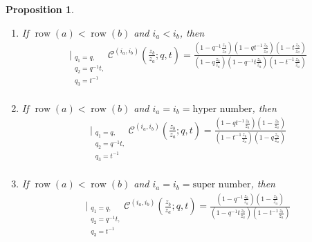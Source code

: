 \documentclass[12pt,reqno,a4paper]{amsart}
\newcommand{\cals}[1]{\mathcal{#1}}
\numberwithin{equation}{section}
\newtheorem{prop}[thm]{Proposition}
\theoremstyle{definition}
\begin{document}
\begin{prop}
\begin{enumerate}[(1)]
\begin{align}
{			\substack{
				q_1 = q, \\
				q_2 = q^{-1}t,\\
				q_3 = t^{-1} \\
			}
		}
		\cals{C}^{(i_a,i_b)}\left(
		\frac{z_b}{z_a}
		; q, t
		\right)
		= 1
	\end{align}
	\normalsize
	\item If $\operatorname{row}(a) < \operatorname{row}(b)$ and $i_a < i_b$, then 
	\footnotesize
	\begin{align}
		\bigg|_{
			\substack{
				q_1 = q, \\
				q_2 = q^{-1}t,\\
				q_3 = t^{-1} \\
			}
		}
		\cals{C}^{(i_a,i_b)}\left(
		\frac{z_b}{z_a}
		; q, t
		\right)
		= 
		\frac{
			\left(1 - q^{-1}\frac{z_b}{z_a}\right)
			\left(1 - qt^{-1}\frac{z_b}{z_a}\right)
			\left(1 - t\frac{z_b}{z_a}\right)
		}{
			\left(1 - q\frac{z_b}{z_a}\right)
			\left(1 - q^{-1}t\frac{z_b}{z_a}\right)
			\left(1 - t^{-1}\frac{z_b}{z_a}\right)
		}
		\label{C7-1704-21jul}
	\end{align}
	\normalsize
	\item If $\operatorname{row}(a) < \operatorname{row}(b)$ and $i_a = i_b = \text{hyper number}$, then 
	\footnotesize
	\begin{align}
		\bigg|_{
			\substack{
				q_1 = q, \\
				q_2 = q^{-1}t,\\
				q_3 = t^{-1} \\
			}
		}
		\cals{C}^{(i_a,i_b)}\left(
		\frac{z_b}{z_a}
		; q, t
		\right)
		= 
		\frac{
			\left(1 - qt^{-1}\frac{z_b}{z_a}\right)
			\left(1 - \frac{z_b}{z_a}\right)
		}{
			\left(1 - t^{-1}\frac{z_b}{z_a}\right)
			\left(1 - q\frac{z_b}{z_a}\right)
		}
		\label{C8-1704-21jul}
	\end{align}
	\normalsize
	\item If $\operatorname{row}(a) < \operatorname{row}(b)$ and $i_a = i_b = \text{super number}$, then 
	\footnotesize
	\begin{align}
		\bigg|_{
			\substack{
				q_1 = q, \\
				q_2 = q^{-1}t,\\
				q_3 = t^{-1} \\
			}
		}
		\cals{C}^{(i_a,i_b)}\left(
		\frac{z_b}{z_a}
		; q, t
		\right)
		= 
		\frac{
			\left(1 - q^{-1}\frac{z_b}{z_a}\right)
			\left(1 - \frac{z_b}{z_a}\right)
		}{
			\left(1 - q^{-1}t\frac{z_b}{z_a}\right)
			\left(1 - t^{-1}\frac{z_b}{z_a}\right)
		}

\end{align}
\end{enumerate}
\end{prop}
\end{document}
